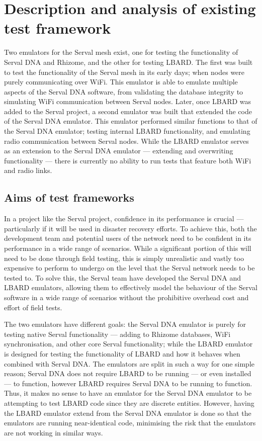 \chapter{Description and analysis of existing test framework} 
\label{Chapter3} 

Two emulators for the Serval mesh exist, one for testing the functionality of Serval DNA and Rhizome, and the other for testing LBARD. 
The first was built to test the functionality of the Serval mesh in its early days; when nodes were purely communicating over WiFi. 
This emulator is able to emulate multiple aspects of the Serval DNA software, from validating the database integrity to simulating WiFi communication between Serval nodes. 
Later, once LBARD was added to the Serval project, a second emulator was built that extended the code of the Serval DNA emulator.
This emulator performed similar functions to that of the Serval DNA emulator; testing internal LBARD functionality, and emulating radio communication between Serval nodes. 
While the LBARD emulator serves as an extension to the Serval DNA emulator — extending and overwriting functionality — there is currently no ability to run tests that feature both WiFi and radio links. 

\section{Aims of test frameworks}
In a project like the Serval project, confidence in its performance is crucial — particularly if it will be used in disaster recovery efforts.
To achieve this, both the development team and potential users of the network need to be confident in its performance in a wide range of scenarios. 
While a significant portion of this will need to be done through field testing, this is simply unrealistic and vastly too expensive to perform to undergo on the level that the Serval network needs to be tested to.
To solve this, the Serval team have developed the Serval DNA and LBARD emulators, allowing them to effectively model the behaviour of the Serval software in a wide range of scenarios without the prohibitive overhead cost and effort of field tests.

The two emulators have different goals: the Serval DNA emulator is purely for testing native Serval functionality — adding to Rhizome databases, WiFi synchronisation, and other core Serval functionality; while the LBARD emulator is designed for testing the functionality of LBARD and how it behaves when combined with Serval DNA.
The emulators are split in such a way for one simple reason; Serval DNA does not require LBARD to be running — or even installed — to function, however LBARD requires Serval DNA to be running to function.
Thus, it makes no sense to have an emulator for the Serval DNA emulator to be attempting to test LBARD code since they are discrete entities.
However, having the LBARD emulator extend from the Serval DNA emulator is done so that the emulators are running near-identical code, minimising the risk that the emulators are not working in similar ways.



